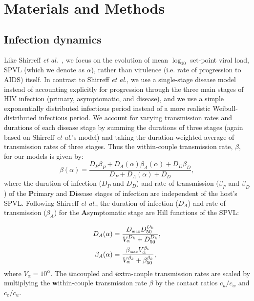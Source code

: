 \documentclass[10pt,letterpaper]{article}
\newcommand{\etal}{\textit{et al.}}
\newcommand{\tsub}[2]{#1_{{\textrm{\tiny #2}}}}
\begin{document}
\section*{Materials and Methods}

\subsection*{Infection dynamics}

Like Shirreff \etal\ \cite{shirreff_transmission_2011}, we focus on the evolution of mean $\log_{10}$ set-point viral load, SPVL (which we denote as $\alpha$), rather than virulence (i.e. rate of progression to AIDS) itself. 
In contrast to Shirreff \etal, we use a single-stage disease model instead of accounting explicitly for progression through the three main stages of HIV infection (primary, asymptomatic, and disease), and we use a simple exponentially distributed infectious period instead of a more realistic Weibull-distributed infectious period. We account for varying transmission rates and durations of each disease stage by summing the durations of three stages (again based on Shirreff \etal's model) and taking the duration-weighted average of transmission rates of three stages. Thus the within-couple transmission rate, $\beta$, for our models is given by:
\begin{equation}
\beta (\alpha) = \frac{D_P \beta_P + D_A (\alpha) \beta_A (\alpha) + D_D \beta_D}{D_P + D_A (\alpha) + D_D},
\end{equation}
where the duration of infection ($D_P$ and $D_D$) and rate of transmission ($\beta_P$ and $\beta_D$) of the \textbf{P}rimary and \textbf{D}isease stages
of infection are independent of the host's SPVL. Following Shirreff \etal, the duration of infection ($D_A$) and rate of transmission ($\beta_A$) for the \textbf{A}symptomatic stage are Hill functions of the SPVL:

\begin{equation}
\begin{split}
D_A(\alpha) &= \frac{\tsub{D}{max} D_{50} ^{D_k}}{V_\alpha ^{D_k} + D_{50}^{D_k}}, \\
\beta_A(\alpha) &= \frac{\tsub{\beta}{max} V_\alpha ^ {\beta_k}}%
{V_\alpha^{\beta_k} + \beta_{50} ^{\beta_k}},
\end{split}
\end{equation}
where $V_{\alpha} = 10^\alpha$. 
The \textbf{u}ncoupled and \textbf{e}xtra-couple transmission rates are scaled by multiplying the \textbf{w}ithin-couple transmission rate $\beta$ by the contact ratios $c_u/c_w$ and $c_e/c_w$.
\end{document}
